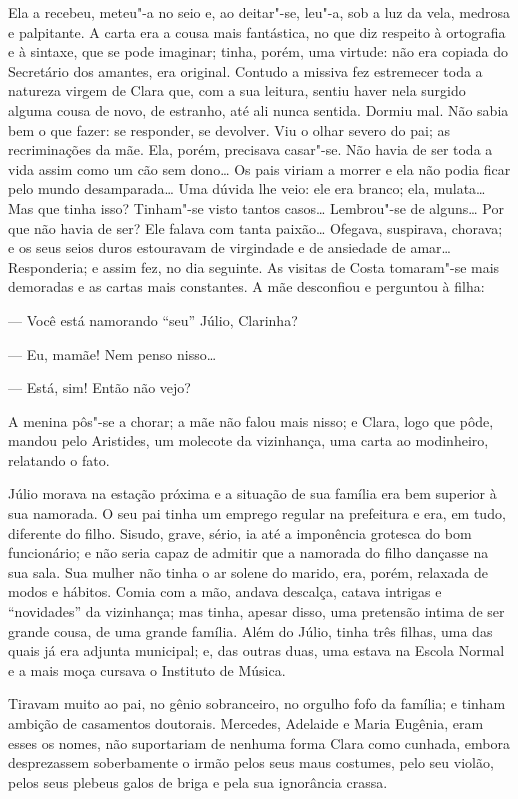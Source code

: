 Ela a recebeu, meteu"-a no seio e, ao deitar"-se, leu"-a, sob a luz da
vela, medrosa e palpitante. A carta era a cousa mais fantástica, no que
diz respeito à ortografia e à sintaxe, que se pode imaginar; tinha,
porém, uma virtude: não era copiada do Secretário dos amantes, era
original. Contudo a missiva fez estremecer toda a natureza virgem de
Clara que, com a sua leitura, sentiu haver nela surgido alguma cousa de
novo, de estranho, até ali nunca sentida. Dormiu mal. Não sabia bem o
que fazer: se responder, se devolver. Viu o olhar severo do pai; as
recriminações da mãe. Ela, porém, precisava casar"-se. Não havia de ser
toda a vida assim como um cão sem dono\ldots{} Os pais viriam a morrer e ela
não podia ficar pelo mundo desamparada\ldots{} Uma dúvida lhe veio: ele era
branco; ela, mulata\ldots{} Mas que tinha isso? Tinham"-se visto tantos
casos\ldots{} Lembrou"-se de alguns\ldots{} Por que não havia de ser? Ele falava
com tanta paixão\ldots{} Ofegava, suspirava, chorava; e os seus seios duros
estouravam de virgindade e de ansiedade de amar\ldots{} Responderia; e assim
fez, no dia seguinte. As visitas de Costa tomaram"-se mais demoradas e as
cartas mais constantes. A mãe desconfiou e perguntou à filha:

--- Você está namorando ``seu'' Júlio, Clarinha?

--- Eu, mamãe! Nem penso nisso\ldots{}

--- Está, sim! Então não vejo?

A menina pôs"-se a chorar; a mãe não falou mais nisso; e Clara, logo que
pôde, mandou pelo Aristides, um molecote da vizinhança, uma carta ao
modinheiro, relatando o fato.

Júlio morava na estação próxima e a situação de sua família era bem
superior à sua namorada. O seu pai tinha um emprego regular na
prefeitura e era, em tudo, diferente do filho. Sisudo, grave, sério, ia
até a imponência grotesca do bom funcionário; e não seria capaz de
admitir que a namorada do filho dançasse na sua sala. Sua mulher não
tinha o ar solene do marido, era, porém, relaxada de modos e hábitos.
Comia com a mão, andava descalça, catava intrigas e ``novidades'' da
vizinhança; mas tinha, apesar disso, uma pretensão intima de ser grande
cousa, de uma grande família. Além do Júlio, tinha três filhas, uma das
quais já era adjunta municipal; e, das outras duas, uma estava na Escola
Normal e a mais moça cursava o Instituto de Música.

Tiravam muito ao pai, no gênio sobranceiro, no orgulho fofo da família;
e tinham ambição de casamentos doutorais. Mercedes, Adelaide e Maria
Eugênia, eram esses os nomes, não suportariam de nenhuma forma Clara
como cunhada, embora desprezassem soberbamente o irmão pelos seus maus
costumes, pelo seu violão, pelos seus plebeus galos de briga e pela sua
ignorância crassa.

